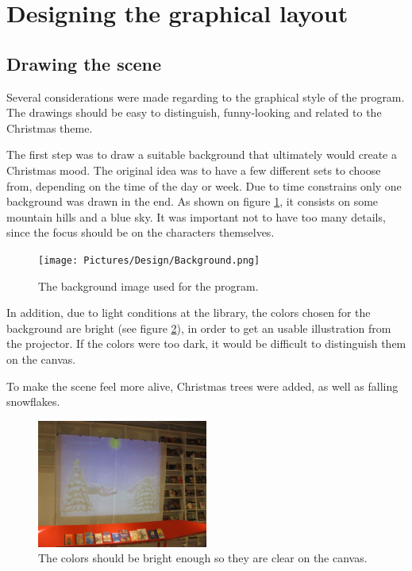 \section{Designing the graphical layout}
\subsection{Drawing the scene}
Several considerations were made regarding to the graphical style of the program. The drawings should be easy to distinguish, funny-looking and related to the Christmas theme. 

The first step was to draw a suitable background that ultimately would create a Christmas mood. The original idea was to have a few different sets to choose from, depending on the time of the day or week. Due to time constrains only one background was drawn in the end. As shown on figure \ref{fig:ip_Background}, it consists on some mountain hills and a blue sky. It was important not to have too many details, since the focus should be on the characters themselves.

\begin{figure}[htbp]
\centering
\texttt{[image: Pictures/Design/Background.png]}
\caption{The background image used for the program.}
\label{fig:ip_Background}
\end{figure}

In addition, due to light conditions at the library, the colors chosen for the background are bright (see figure \ref{fig:background_projector}), in order to get an usable illustration from the projector. If the colors were too dark, it would be difficult to distinguish them on the canvas.

To make the scene feel more alive, Christmas trees were added, as well as falling snowflakes.

\begin{figure}[htbp]
\centering
\includegraphics[width=0.50\textwidth]{Pictures/Design/background_projector}
\caption{The colors should be bright enough so they are clear on the canvas.}
\label{fig:background_projector}
\end{figure}

